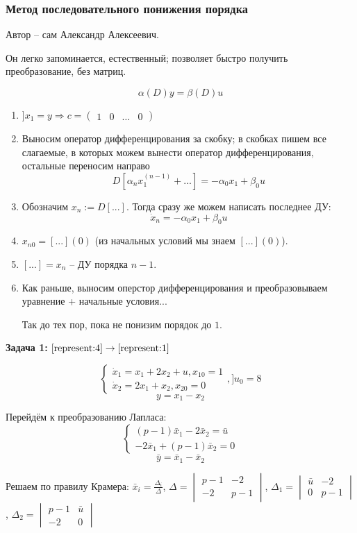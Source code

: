 \documentclass[main.tex]{subfiles}
\begin{document}
\subsubsection{ Метод последовательного понижения порядка }
Автор -- сам Александр Алексеевич.

Он легко запоминается, естественный; позволяет быстро получить преобразование, без матриц.

\[ \alpha(D) y = \beta(D)u \]

\begin{enumerate}[noitemsep]
	\item $ ] x_1 = y \Rightarrow c = \begin{pmatrix}
        1 & 0 & \dots & 0
    \end{pmatrix} $
	\item Выносим оператор дифференцирования за скобку; в скобках пишем все слагаемые, в которых можем вынести оператор дифференцирования, остальные переносим направо
    \[ D[\alpha_n x_1^{(n-1)} + ...] = - \alpha_0 x_1 + \beta_0 u \]
	\item Обозначим $ x_n := D[...] $.
    Тогда сразу же можем написать последнее ДУ:
    \[ \dot x_n = - \alpha_0 x_1 + \beta_0 u \]
	\item $ x_{n0} = [...](0) $ (из начальных условий мы знаем $ [...](0) $).
	\item $ [...] = x_n $ -- ДУ порядка $n-1$.
	\item Как раньше, выносим оперстор дифференцирования и преобразовываем уравнение + начальные условия...

    Так до тех пор, пока не понизим порядок до $ 1 $.
\end{enumerate}

\textbf{ Задача 1: } $ \ref{represent:4} \to \ref{represent:1} $

\[ \begin{cases}
    \dot x_1 = x_1 + 2 x_2 + u, x_{10} = 1 \\
    \dot x_2 = 2 x_1 + x_2, x_{20} = 0
\end{cases}, ] u_0 = 8 \]
\[ y = x_1 - x_2 \]

Перейдём к преобразованию Лапласа:
\[ \begin{cases}
    (p-1) \bar x_1 - 2 \bar x_2 = \bar u \\
    -2 \bar x_1 + (p-1) \bar x_2 = 0
\end{cases} \]
\[ \bar y = \bar x_1 - \bar x_2 \]

Решаем по правилу Крамера: $ \bar x_i = \frac{\Delta_i}{\Delta} $, $ \Delta = \begin{vmatrix}
    p - 1 & -2 \\
    -2 & p - 1
\end{vmatrix} $, $ \Delta_1 = \begin{vmatrix}
\bar u & -2 \\
0 & p - 1
\end{vmatrix} $, $ \Delta_2 = \begin{vmatrix}
p - 1 & \bar u \\
-2 & 0
\end{vmatrix} $
\end{document}
